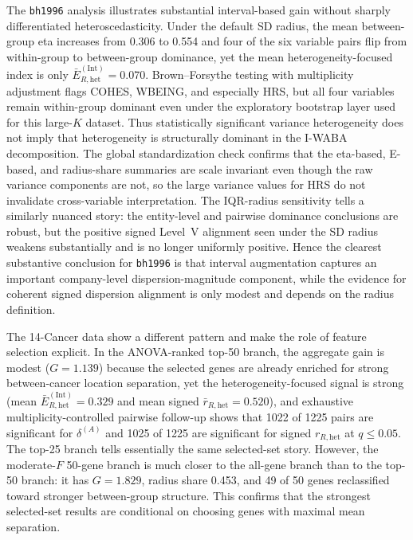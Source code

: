 \documentclass[preprint, times, 12pt, authoryear]{elsarticle}
\begin{document}
The \texttt{bh1996} analysis illustrates substantial interval-based gain without sharply differentiated heteroscedasticity. Under the default SD radius, the mean between-group eta increases from 0.306 to 0.554 and four of the six variable pairs flip from within-group to between-group dominance, yet the mean heterogeneity-focused index is only $\bar E_{R,\mathrm{het}}^{(\mathrm{Int})}=0.070$. Brown--Forsythe testing with multiplicity adjustment flags COHES, WBEING, and especially HRS, but all four variables remain within-group dominant even under the exploratory bootstrap layer used for this large-$K$ dataset. Thus statistically significant variance heterogeneity does not imply that heterogeneity is structurally dominant in the I-WABA decomposition. The global standardization check confirms that the eta-based, E-based, and radius-share summaries are scale invariant even though the raw variance components are not, so the large variance values for HRS do not invalidate cross-variable interpretation. The IQR-radius sensitivity tells a similarly nuanced story: the entity-level and pairwise dominance conclusions are robust, but the positive signed Level~V alignment seen under the SD radius weakens substantially and is no longer uniformly positive. Hence the clearest substantive conclusion for \texttt{bh1996} is that interval augmentation captures an important company-level dispersion-magnitude component, while the evidence for coherent signed dispersion alignment is only modest and depends on the radius definition.

The 14-Cancer data show a different pattern and make the role of feature selection explicit. In the ANOVA-ranked top-50 branch, the aggregate gain is modest ($G=1.139$) because the selected genes are already enriched for strong between-cancer location separation, yet the heterogeneity-focused signal is strong (mean $\bar E_{R,\mathrm{het}}^{(\mathrm{Int})}=0.329$ and mean signed $\bar r_{R,\mathrm{het}}=0.520$), and exhaustive multiplicity-controlled pairwise follow-up shows that 1022 of 1225 pairs are significant for $\delta^{(A)}$ and 1025 of 1225 are significant for signed $r_{R,\mathrm{het}}$ at $q\le 0.05$. The top-25 branch tells essentially the same selected-set story. However, the moderate-$F$ 50-gene branch is much closer to the all-gene branch than to the top-50 branch: it has $G=1.829$, radius share 0.453, and 49 of 50 genes reclassified toward stronger between-group structure. This confirms that the strongest selected-set results are conditional on choosing genes with maximal mean separation.
\end{document}
